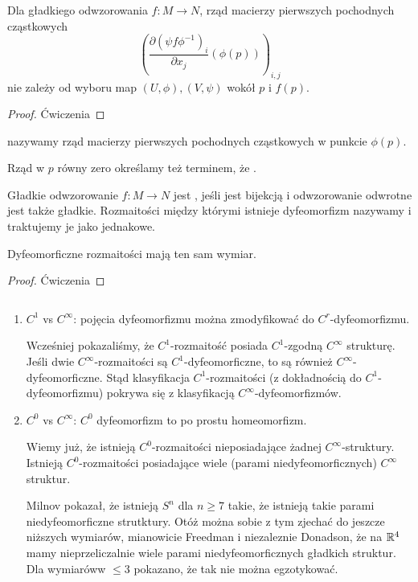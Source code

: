 \begin{fact}
    Dla gładkiego odwzorowania $f:M\to N$, rząd macierzy pierwszych pochodnych cząstkowych 
    $$\left(\frac{\partial(\psi f\phi^{-1})_i}{\partial x_j}(\phi(p))\right)_{i,j}$$ 
    nie zależy od wyboru map $(U,\phi),(V,\psi)$ wokół $p$ i $f(p)$.
\end{fact}
\begin{proof}Ćwiczenia\end{proof}

\begin{definition}
 nazywamy rząd macierzy pierwszych pochodnych cząstkowych w punkcie $\phi(p)$.

Rząd w $p$ równy zero określamy też terminem, że .
\end{definition}

\begin{definition}[dyfeomorfizm]
    Gładkie odwzorowanie $f:M\to N$ jest , jeśli jest bijekcją i odwzorowanie odwrotne jest także gładkie. Rozmaitości między którymi istnieje dyfeomorfizm nazywamy  i traktujemy je jako jednakowe.
\end{definition}

\begin{fact}
    Dyfeomorficzne rozmaitości mają ten sam wymiar.
\end{fact}
\begin{proof}Ćwiczenia
\end{proof}

\begin{remark}
$ $\newline
    \begin{enumerate}
        \item $C^1$ vs $C^\infty$: pojęcia dyfeomorfizmu można zmodyfikować do $C^r$-dyfeomorfizmu.
        
        Wcześniej pokazaliśmy, że $C^1$-rozmaitość posiada $C^1$-zgodną $C^\infty$ strukturę. Jeśli dwie $C^\infty$-rozmaitości są $C^1$-dyfeomorficzne, to są również $C^\infty$-dyfeomorficzne. Stąd klasyfikacja $C^1$-rozmaitości (z dokładnością do $C^1$-dyfeomorfizmu) pokrywa się z klasyfikacją $C^\infty$-dyfeomorfizmów.
        \item $C^0$ vs $C^\infty$: $C^0$ dyfeomorfizm to po prostu homeomorfizm. 
        
        Wiemy już, że istnieją $C^0$-rozmaitości nieposiadające żadnej $C^\infty$-struktury. Istnieją $C^0$-rozmaitości posiadające wiele (parami niedyfeomorficznych) $C^\infty$ struktur. 

        Milnov pokazał, że istnieją $S^n$ dla $n\geq7$ takie, że istnieją takie parami niedyfeomorficzne strutktury. Otóż można sobie z tym zjechać do jeszcze niższych wymiarów, mianowicie Freedman i niezaleznie Donadson, że na $\mathbb{R}^4$ mamy nieprzeliczalnie wiele parami niedyfeomorficznych gładkich struktur. Dla wymiaróww $\leq3$ pokazano, że tak nie można egzotykować. 
    \end{enumerate}
\end{remark}

